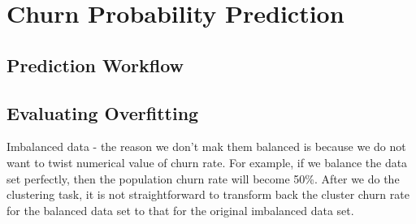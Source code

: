 \section{Churn Probability Prediction}
\label{sec:prediction}

\subsection{Prediction Workflow}

\subsection{Evaluating Overfitting}


Imbalanced data - the reason we don't mak them balanced is because we do not want to twist numerical value of churn rate. For example, if we balance the data set perfectly, then the population churn rate will become 50\%. After we do the clustering task, it is not straightforward to transform back the cluster churn rate for the balanced data set to that for the original imbalanced data set.